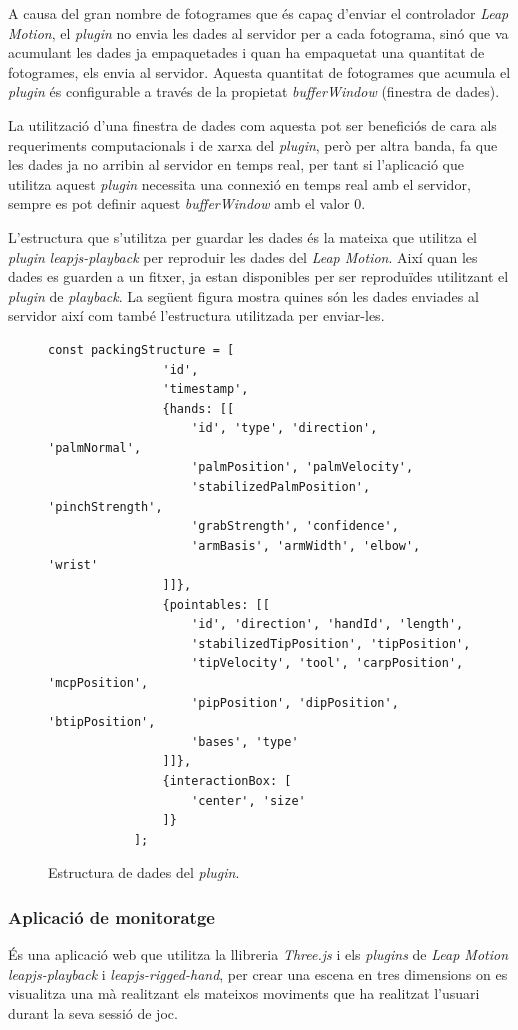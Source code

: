 \documentclass[12pt,a4paper,catalan]{article}
\begin{document}
	A causa del gran nombre de fotogrames que és capaç d'enviar el controlador \textit{Leap Motion}, el \textit{plugin} no envia les dades al servidor per a cada fotograma, sinó que va acumulant les dades ja empaquetades i quan ha empaquetat una quantitat de fotogrames, els envia al servidor. Aquesta quantitat de fotogrames que acumula el \textit{plugin} és configurable a través de la propietat \textit{bufferWindow} (finestra de dades).
	
	La utilització d'una finestra de dades com aquesta pot ser beneficiós de cara als requeriments computacionals i de xarxa del \textit{plugin}, però per altra banda, fa que les dades ja no arribin al servidor en temps real, per tant si l'aplicació que utilitza aquest \textit{plugin} necessita una connexió en temps real amb el servidor, sempre es pot definir aquest \textit{bufferWindow} amb el valor 0.
	
	L'estructura que s'utilitza per guardar les dades és la mateixa que utilitza el \textit{plugin} \textit{leapjs-playback} \cite{leapjs-playback} per reproduir les dades del \textit{Leap Motion}. Així quan les dades es guarden a un fitxer, ja estan disponibles per ser reproduïdes utilitzant el \textit{plugin} de \textit{playback}.
	La següent figura mostra quines són les dades enviades al servidor així com també l'estructura utilitzada per enviar-les.
	\begin{figure}[H]
		\begin{lstlisting}[gobble=12, tabsize=4]
			const packingStructure = [
				'id',
				'timestamp',
				{hands: [[
					'id', 'type', 'direction', 'palmNormal',
					'palmPosition', 'palmVelocity',
					'stabilizedPalmPosition', 'pinchStrength',
					'grabStrength', 'confidence',
					'armBasis', 'armWidth', 'elbow', 'wrist'
				]]},
				{pointables: [[
					'id', 'direction', 'handId', 'length',
					'stabilizedTipPosition', 'tipPosition',
					'tipVelocity', 'tool', 'carpPosition', 'mcpPosition',
					'pipPosition', 'dipPosition', 'btipPosition',
					'bases', 'type'
				]]},
				{interactionBox: [
					'center', 'size'
				]}
			];
		\end{lstlisting}
		\caption{Estructura de dades del \textit{plugin}.}
		\label{fig:packaging-structure}
	\end{figure}
	\subsubsection{Aplicació de monitoratge}
	És una aplicació web que utilitza la llibreria \textit{Three.js} i els \textit{plugins} de \textit{Leap Motion} \textit{leapjs-playback} i \textit{leapjs-rigged-hand}, per crear una escena en tres dimensions on es visualitza una mà realitzant els mateixos moviments que ha realitzat l'usuari durant la seva sessió de joc.
	
\end{document}
